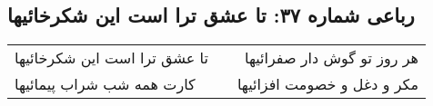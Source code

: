 \begin{center}
\section*{رباعی شماره ۳۷: تا عشق ترا است این شکرخائیها}
\label{sec:0037}
\begin{longtable}{l p{0.5cm} r}
تا عشق ترا است این شکرخائیها
&&
هر روز تو گوش دار صفرائیها
\\
کارت همه شب شراب پیمائیها
&&
مکر و دغل و خصومت افزائیها
\\
\end{longtable}
\end{center}
